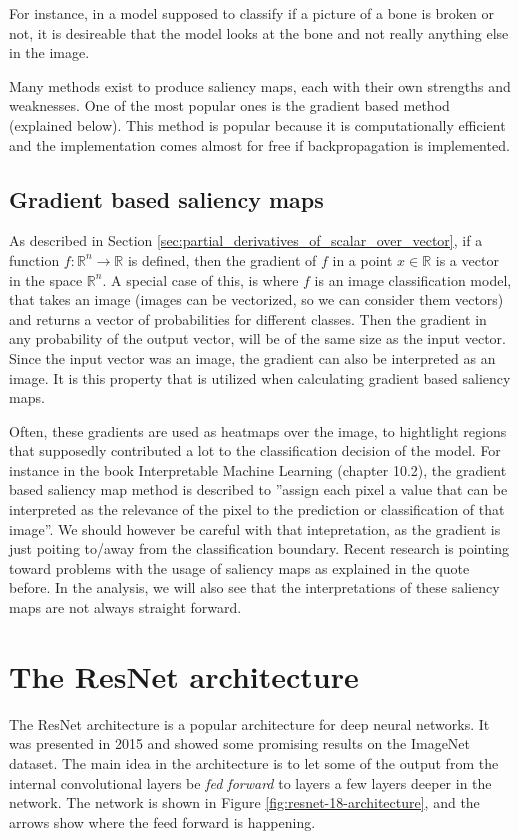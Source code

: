 For instance, in a model supposed to classify if a picture of a bone is broken or not,
it is desireable that the model looks at the bone and not really anything else in the image.

Many methods exist to produce saliency maps, each with their own strengths and weaknesses.
One of the most popular ones is the gradient based method (explained below).
This method is popular because it is computationally efficient and the implementation comes almost for free if backpropagation is implemented.

\subsection{Gradient based saliency maps} \label{sec:gradiant_saliency_maps}
As described in Section \ref{sec:partial_derivatives_of_scalar_over_vector},
if a function $f: \mathbb{R}^n \rightarrow \mathbb{R}$ is defined,
then the gradient of $f$ in a point $x\in\mathbb{R}$ is a vector in the space $\mathbb{R}^n$.
A special case of this, is where $f$ is an image classification model, that takes
an image (images can be vectorized, so we can consider them vectors) and returns a vector of probabilities for
different classes.
Then the gradient in any probability of the output vector, will be of the same size as the input vector.
Since the input vector was an image, the gradient can also be interpreted as an image.
It is this property that is utilized when calculating gradient based saliency maps.

Often, these gradients are used as heatmaps over the image, to hightlight regions that
supposedly contributed a lot to the classification decision of the model.
For instance in the book Interpretable Machine Learning (chapter 10.2)\cite{interpretable-machine-learning}, the gradient based
saliency map method is described to
''assign each pixel a value that can be interpreted as the relevance of the pixel to the prediction or classification of that image''.
We should however be careful with that intepretation, as the gradient is just poiting to/away from the classification boundary.
Recent research is pointing toward problems with the usage of saliency maps as explained in the quote before\cite{false-hope}.
In the analysis, we will also see that the interpretations of these saliency maps are not always straight forward.

\section{The ResNet architecture}
The ResNet architecture is a popular architecture for deep neural networks.
It was presented in 2015 and showed some promising results on the ImageNet dataset\cite{RESNET-paper}.
The main idea in the architecture is to let some of the output from the internal convolutional layers
be \textit{fed forward} to layers a few layers deeper in the network.
The network is shown in Figure \ref{fig:resnet-18-architecture},
and the arrows show where the feed forward is happening.

